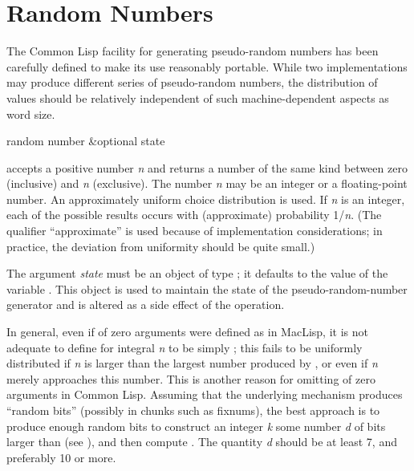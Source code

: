 \section{Random Numbers}
\label{RANDOM}

The Common Lisp facility for generating pseudo-random numbers has
been carefully defined to make its use reasonably portable.
While two implementations may produce different series
of pseudo-random numbers, the distribution of values should
be relatively independent of such machine-dependent aspects
as word size.

\begin{defun}[Function]
random number &optional state

 accepts a positive number \emph{n} and returns
a number of the same kind between zero (inclusive) and \emph{n} (exclusive).
The number \emph{n} may be an integer or a floating-point number.
An approximately uniform choice distribution is used.
If \emph{n} is an integer, each of the possible results
occurs with (approximate) probability 1/\emph{n}.
(The qualifier ``approximate'' is used because of implementation
considerations; in practice, the deviation from uniformity should be
quite small.)

The argument \emph{state} must be an object of type ;
it defaults to the value of the variable .
This object is used to maintain the state of the pseudo-random-number
generator and is altered as a side effect of the  operation.

\beforenoterule
\begin{implementation}
In general, even if  of zero arguments
were defined as in MacLisp,
it is not adequate to define  for integral \emph{n}
to be simply ; this fails to be uniformly distributed
if \emph{n} is larger than the largest number produced by ,
or even if \emph{n} merely approaches this number.
This is another reason for omitting  of zero arguments in Common Lisp.
Assuming that the underlying mechanism produces ``random bits''
(possibly in chunks such as fixnums), the best approach is to produce
enough random bits to construct an integer \emph{k} some number \emph{d} of bits
larger than  (see ), and
then compute .  The quantity \emph{d} should be at
least 7, and preferably 10 or more.


\end{implementation}
\end{defun}
